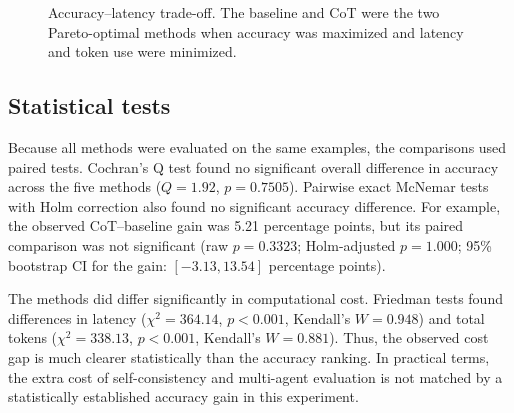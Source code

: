 \documentclass[10pt]{article}
\begin{document}
\begin{figure}[ht]
\centering
{}
\caption{Accuracy--latency trade-off. The baseline and CoT were the two Pareto-optimal methods when accuracy was maximized and latency and token use were minimized.}
\label{fig:tradeoff}
\end{figure}

\subsection{Statistical tests}
Because all methods were evaluated on the same examples, the comparisons used paired tests. Cochran's Q test found no significant overall difference in accuracy across the five methods ($Q=1.92$, $p=0.7505$). Pairwise exact McNemar tests with Holm correction also found no significant accuracy difference. For example, the observed CoT--baseline gain was 5.21 percentage points, but its paired comparison was not significant (raw $p=0.3323$; Holm-adjusted $p=1.000$; 95\% bootstrap CI for the gain: $[-3.13, 13.54]$ percentage points).

The methods did differ significantly in computational cost. Friedman tests found differences in latency ($\chi^2=364.14$, $p<0.001$, Kendall's $W=0.948$) and total tokens ($\chi^2=338.13$, $p<0.001$, Kendall's $W=0.881$). Thus, the observed cost gap is much clearer statistically than the accuracy ranking. In practical terms, the extra cost of self-consistency and multi-agent evaluation is not matched by a statistically established accuracy gain in this experiment.
\end{document}
